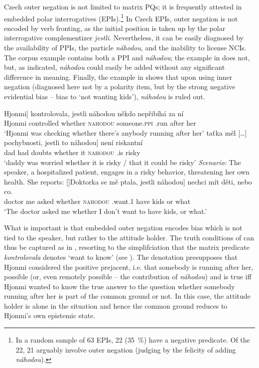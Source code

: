 \documentclass[output=paper,colorlinks,citecolor=brown]{langscibook}
\begin{document}
\noindent Czech outer negation is not limited to matrix PQs; it is frequently attested in embedded polar interrogatives (EPIs).\footnote{In a random sample of 63 EPIs, 22 (\qty{35}{\percent}) have a negative predicate. Of the 22, 21 arguably involve outer negation (judging by the felicity of adding \textit{náhodou}).\label{sim:fn:embedded}} In Czech EPIs, outer negation is not encoded by verb fronting, as the initial position is taken up by the polar interrogative complementizer \textit{jestli}. Nevertheless, it can be easily diagnosed by the availability of PPIs, the particle \textit{náhodou}, and the inability to license NCIs. The corpus example  contains both a PPI and \textit{náhodou}; the example in  does not, but, as indicated, \textit{náhodou} could easily be added without any significant difference in meaning. Finally, the example in  shows that upon using inner negation (diagnosed here not by a polarity item, but by the strong negative evidential bias -- bias to `not wanting kids'), \textit{náhodou} is ruled out.

\eanoraggedright\label{sim:ex:epi}
\begin{xlist}
\ex\gll \minsp{[} Hjonmi] kontrolovala, jestli náhodou někdo nepřibíhá za ní\label{sim:ex:epi-a}\\
{} Hjonmi controlled whether \textsc{nahodou} someone.\textsc{ppi} {\NEG}.run after her\\
\glt `Hjonmi was checking whether there's anybody running after her'
\ex\gll taťka měl [\dots] pochybnosti, jestli to \minsp{[} náhodou] není riskantní\label{sim:ex:epi-b}\\
dad had {} doubts whether it {} \textsc{nahodou} {\NEG}.is risky\\
\glt `daddy was worried whether it is risky / that it could be risky'
\ex \textit{Scenario:} The speaker, a hospitalized patient, engages in a risky behavior, threatening her own health. She reports:\label{sim:ex:epi-c}
\exi{}[]{\gll Doktorka se mě ptala, jestli \minsp{[\#} náhodou] nechci mít děti, nebo co.\\
doctor {\REFL} me asked whether {} \textsc{nahodou} {\NEG}.want.1{\SG} have kids or what\\
\glt `The doctor asked me whether I don't want to have kids, or what.'}
\end{xlist}
\z

\noindent What is important is that embedded outer negation encodes bias which is not tied to the speaker, but rather to the attitude holder. The truth conditions of  can thus be captured as in , resorting to the simplifciation that the matrix predicate \textit{kontrolovala} denotes `want to know' (see ). The denotation presupposes that Hjonmi considered the positive prejacent, i.e. that somebody is running after her, possible (or, even remotely possible -- the contribution of \textit{náhodou}) and is true iff Hjonmi wanted to know the true answer to the question whether somebody running after her is part of the common ground or not. In this case, the attitude holder is alone in the situation and hence the common ground reduces to Hjonmi's own epistemic state.
\end{document}
